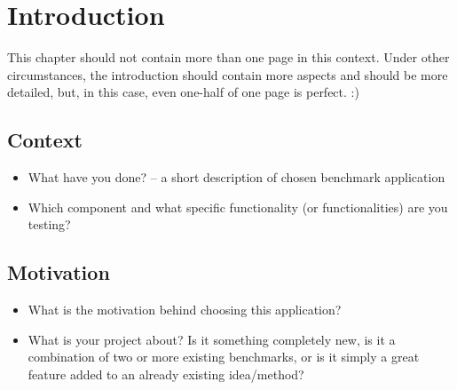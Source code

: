 \chapter{Introduction}

This chapter should not contain more than one page in this context. Under other circumstances, the introduction should contain more aspects and should be more detailed, but, in this case, even one-half of 
one page is perfect. :) 

\section{Context}

\begin{itemize}
  \item What have you done? -- a short description of chosen benchmark application
  \item  Which component and what specific functionality (or functionalities) are you testing?

\end{itemize}

\section{Motivation}

\begin{itemize}
  \item What is the motivation behind choosing this application?
  
  \item What is your project about? Is it something completely new, is it a combination of two or more existing benchmarks, or is it simply a great feature added to an already existing idea/method?

\end{itemize}
